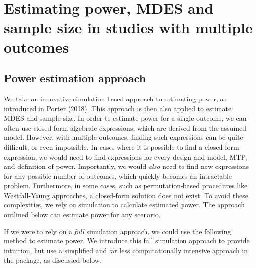\documentclass[
]{article}
\begin{document}
\section{Estimating power, MDES and sample size in studies with multiple outcomes}
\label{sec:est}

\subsection{Power estimation approach}
\label{sec:est_power}

We take an innovative simulation-based approach to estimating power, as
introduced in Porter (2018). This approach is then also applied to
estimate MDES and sample size. In order to estimate power for a single
outcome, we can often use closed-form algebraic expressions, which are
derived from the assumed model. However, with multiple outcomes, finding
such expressions can be quite difficult, or even impossible. In cases
where it is possible to find a closed-form expression, we would need to
find expressions for every design and model, MTP, and definition of
power. Importantly, we would \emph{also} need to find new expressions
for any possible number of outcomes, which quickly becomes an
intractable problem. Furthermore, in some cases, such as
permutation-based procedures like Westfall-Young approaches, a
closed-form solution does not exist. To avoid these complexities, we
rely on simulation to calculate estimated power. The approach outlined
below can estimate power for any scenario.

If we were to rely on a \emph{full} simulation approach, we could use
the following method to estimate power. We introduce this full
simulation approach to provide intuition, but use a simplified and far
less computationally intensive approach in the package, as discussed
below.
\end{document}
